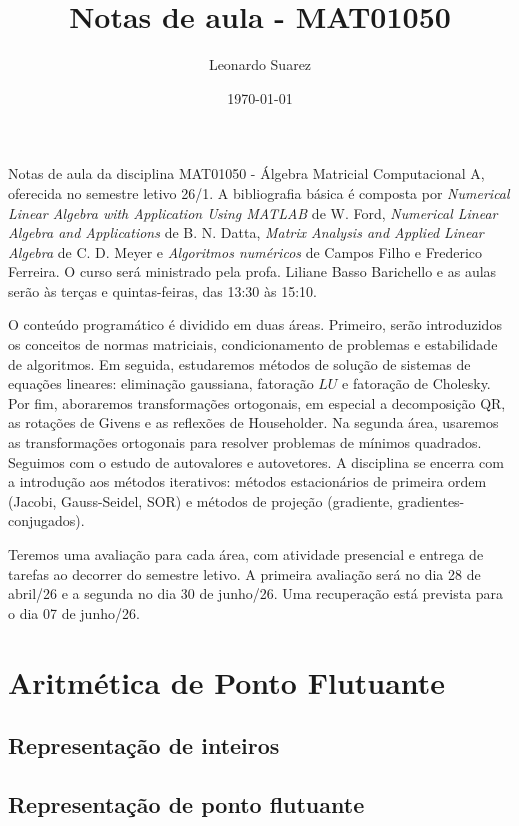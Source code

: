 \documentclass{article}
\title{Notas de aula - MAT01050}
\author{Leonardo Suarez}
\date{\today}
\begin{document}
\maketitle

Notas de aula da disciplina MAT01050 - Álgebra Matricial Computacional A, oferecida no semestre letivo 26/1. A bibliografia básica é composta por \emph{Numerical Linear Algebra with Application Using MATLAB} de W. Ford, \emph{Numerical Linear Algebra and Applications} de B. N. Datta, \emph{Matrix Analysis and Applied Linear Algebra} de C. D. Meyer e \emph{Algoritmos numéricos} de Campos Filho e Frederico Ferreira. O curso será ministrado pela profa. Liliane Basso Barichello e as aulas serão às terças e quintas-feiras, das 13:30 às 15:10. 

O conteúdo programático é dividido em duas áreas. Primeiro, serão introduzidos os conceitos de normas matriciais, condicionamento de problemas e estabilidade de algoritmos. Em seguida, estudaremos métodos de solução de sistemas de equações lineares: eliminação gaussiana, fatoração \(LU\) e fatoração de Cholesky. Por fim, aboraremos transformações ortogonais, em especial a decomposição QR, as rotações de Givens e as reflexões de Householder.
Na segunda área, usaremos as transformações ortogonais para resolver problemas de mínimos quadrados. Seguimos com o estudo de autovalores e autovetores. A disciplina se encerra com a introdução aos métodos iterativos: métodos estacionários de primeira ordem (Jacobi, Gauss-Seidel, SOR) e métodos de projeção (gradiente, gradientes-conjugados).

Teremos uma avaliação para cada área, com atividade presencial e entrega de tarefas ao decorrer do semestre letivo. A primeira avaliação será no dia 28 de abril/26 e a segunda no dia 30 de junho/26. Uma recuperação está prevista para o dia 07 de junho/26.

\tableofcontents
\lstlistoflistings

\section{Aritmética de Ponto Flutuante}

\subsection{Representação de inteiros}
\subsection{Representação de ponto flutuante}
\end{document}
